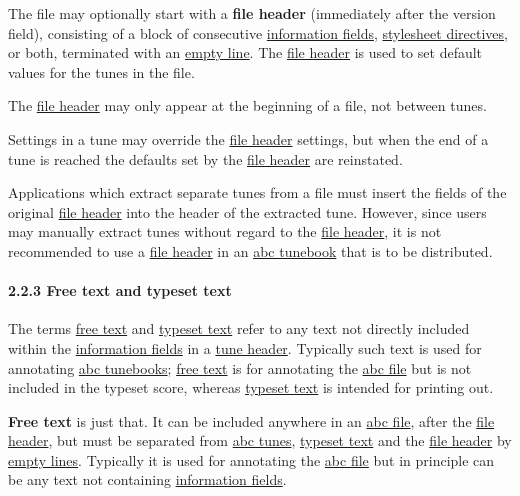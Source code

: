 \documentclass[oneside]{book}
\let\oldparagraph\paragraph
\renewcommand{\paragraph}[1]{\oldparagraph{#1}\mbox{}}
\begin{document}
\href{}{}The file may optionally start with a \textbf{file header}
(immediately after the version field), consisting of a block of
consecutive \protect\hyperlink{information_field_definition}{information
fields}, \protect\hyperlink{stylesheet_directive_definition}{stylesheet
directives}, or both, terminated with an
\protect\hyperlink{empty_line_definition}{empty line}. The
\protect\hyperlink{file_header_definition}{file header} is used to set
default values for the tunes in the file.

The \protect\hyperlink{file_header_definition}{file header} may only
appear at the beginning of a file, not between tunes.

Settings in a tune may override the
\protect\hyperlink{file_header_definition}{file header} settings, but
when the end of a tune is reached the defaults set by the
\protect\hyperlink{file_header_definition}{file header} are reinstated.

Applications which extract separate tunes from a file must insert the
fields of the original \protect\hyperlink{file_header_definition}{file
header} into the header of the extracted tune. However, since users may
manually extract tunes without regard to the
\protect\hyperlink{file_header_definition}{file header}, it is not
recommended to use a \protect\hyperlink{file_header_definition}{file
header} in an \protect\hyperlink{abc_tunebook_definition}{abc tunebook}
that is to be distributed.

\hypertarget{free_text_and_typeset_text}{\paragraph{2.2.3 Free text and
typeset text}\label{free_text_and_typeset_text}}

The terms \protect\hyperlink{free_text_definition}{free text} and
\protect\hyperlink{typeset_text_definition}{typeset text} refer to any
text not directly included within the
\protect\hyperlink{information_field_definition}{information fields} in
a \protect\hyperlink{tune_header_definition}{tune header}. Typically
such text is used for annotating
\protect\hyperlink{abc_tunebook_definition}{abc tunebooks};
\protect\hyperlink{free_text_definition}{free text} is for annotating
the \protect\hyperlink{abc_file_definition}{abc file} but is not
included in the typeset score, whereas
\protect\hyperlink{typeset_text_definition}{typeset text} is intended
for printing out.

\href{}{}\textbf{Free text} is just that. It can be included anywhere in
an \protect\hyperlink{abc_file_definition}{abc file}, after the
\protect\hyperlink{file_header_definition}{file header}, but must be
separated from \protect\hyperlink{abc_tune_definition}{abc tunes},
\protect\hyperlink{typeset_text_definition}{typeset text} and the
\protect\hyperlink{file_header_definition}{file header} by
\protect\hyperlink{empty_line_definition}{empty lines}. Typically it is
used for annotating the \protect\hyperlink{abc_file_definition}{abc
file} but in principle can be any text not containing
\protect\hyperlink{information_field_definition}{information fields}.
\end{document}

